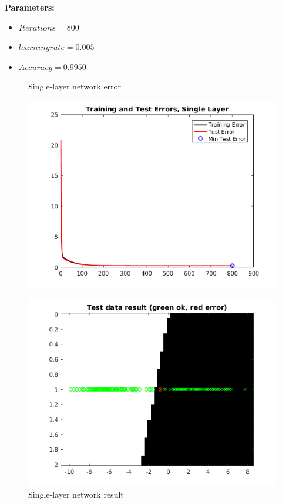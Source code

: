 \documentclass[a4paper,12pt]{article}
\begin{document}
\textbf{Parameters:}
\begin{itemize}
\item $Iterations = 800$
\item $learning rate = 0.005$
\item $Accuracy = 0.9950$
\end{itemize}
\begin{figure}[H]
\centering
  \begin{minipage}[]{0.49\textwidth}
  \caption{Single-layer network error}\label{fig:single_1_error}
  \includegraphics[width=\textwidth]{figures/single_1_error.png}
  \end{minipage}
  \begin{minipage}[]{0.49\textwidth}
  \caption{Single-layer network result}\label{fig:single_1_test}
  \includegraphics[width=\textwidth]{figures/single_1_test.png}
  \end{minipage}
\end{figure}
\end{document}

